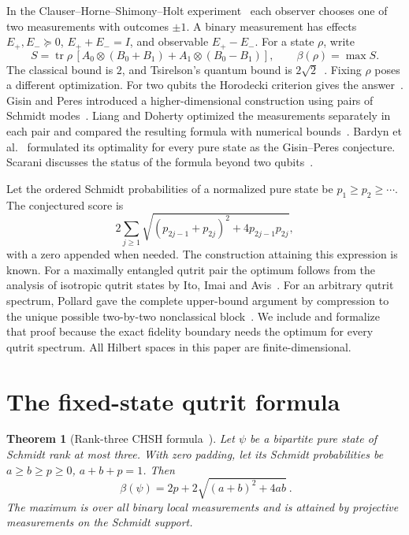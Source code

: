 \documentclass[11pt]{article}
\newtheorem{theorem}{Theorem}[section]
\newcommand{\Tr}{\operatorname{tr}}\newcommand{\rank}{\operatorname{rank}}
\begin{document}
In the Clauser--Horne--Shimony--Holt experiment~\cite{chsh} each observer chooses one of two measurements with outcomes $\pm1$. A binary measurement has effects $E_+,E_-\succeq0$, $E_++E_-=I$, and observable $E_+-E_-$. For a state $\rho$, write
\[
 S=\Tr\rho\,[A_0\otimes(B_0+B_1)+A_1\otimes(B_0-B_1)],
 \qquad \beta(\rho)=\max S .
\]
The classical bound is $2$, and Tsirelson's quantum bound is $2\sqrt2$~\cite{tsirelson}. Fixing $\rho$ poses a different optimization. For two qubits the Horodecki criterion gives the answer~\cite{horodecki}. Gisin and Peres introduced a higher-dimensional construction using pairs of Schmidt modes~\cite{gp}. Liang and Doherty optimized the measurements separately in each pair and compared the resulting formula with numerical bounds~\cite{liang}. Bardyn et al.~\cite[Eq.~(15)]{bardyn} formulated its optimality for every pure state as the Gisin--Peres conjecture. Scarani discusses the status of the formula beyond two qubits~\cite[Sec.~3.2.4]{scarani}.

Let the ordered Schmidt probabilities of a normalized pure state be $p_1\ge p_2\ge\cdots$. The conjectured score is
\begin{equation}
   2\sum_{j\ge1}\sqrt{(p_{2j-1}+p_{2j})^2+4p_{2j-1}p_{2j}},
   \label{eq:gp}
\end{equation}
with a zero appended when needed. The construction attaining this expression is known. For a maximally entangled qutrit pair the optimum follows from the analysis of isotropic qutrit states by Ito, Imai and Avis~\cite{ito}. For an arbitrary qutrit spectrum, Pollard gave the complete upper-bound argument by compression to the unique possible two-by-two nonclassical block~\cite{pollard}. We include and formalize that proof because the exact fidelity boundary needs the optimum for every qutrit spectrum. All Hilbert spaces in this paper are finite-dimensional.

\section{The fixed-state qutrit formula}
\begin{theorem}[Rank-three CHSH formula~{\cite{pollard}}]\label{th:main}
Let $\psi$ be a bipartite pure state of Schmidt rank at most three. With zero padding, let its Schmidt probabilities be $a\ge b\ge p\ge0$, $a+b+p=1$. Then
\begin{equation}
 \boxed{\ \beta(\psi)=2p+2\sqrt{(a+b)^2+4ab}\ }. \label{eq:qutrit}
\end{equation}
The maximum is over all binary local measurements and is attained by projective measurements on the Schmidt support.
\end{theorem}
\end{document}
